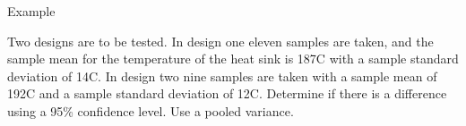 \begin{frame}{Example}

  Two designs are to be tested. In design one eleven samples are
  taken, and the sample mean for the temperature of the heat sink is
  187C with a sample standard deviation of 14C. In design two nine
  samples are taken with a sample mean of 192C and a sample standard
  deviation of 12C. Determine if there is a difference using a 95\%
  confidence level. Use a pooled variance.

  \vfill

\end{frame}


